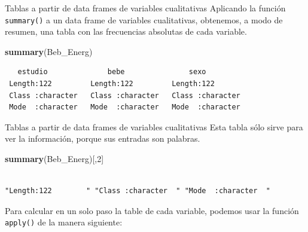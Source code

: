 \documentclass[
  ignorenonframetext,
  aspectratio=169]{beamer}
\newenvironment{Shaded}{\begin{snugshade}}{\end{snugshade}}
\newcommand{\DecValTok}[1]{\textcolor[rgb]{0.00,0.00,0.81}{#1}}
\newcommand{\FunctionTok}[1]{\textcolor[rgb]{0.13,0.29,0.53}{\textbf{#1}}}
\newcommand{\NormalTok}[1]{#1}
\begin{document}
\begin{frame}[fragile]{Tablas a partir de data frames de variables
cualitativas}
\label{tablas-a-partir-de-data-frames-de-variables-cualitativas-3}
Aplicando la función \texttt{summary()} a un data frame de variables
cualitativas, obtenemos, a modo de resumen, una tabla con las
frecuencias absolutas de cada variable.

\begin{Shaded}
\begin{Highlighting}[]
\FunctionTok{summary}\NormalTok{(Beb\_Energ)}
\end{Highlighting}
\end{Shaded}

\begin{verbatim}
   estudio              bebe               sexo          
 Length:122         Length:122         Length:122        
 Class :character   Class :character   Class :character  
 Mode  :character   Mode  :character   Mode  :character  
\end{verbatim}
\end{frame}

\begin{frame}[fragile]{Tablas a partir de data frames de variables
cualitativas}
\label{tablas-a-partir-de-data-frames-de-variables-cualitativas-4}
Esta tabla sólo sirve para ver la información, porque sus entradas son
palabras.

\begin{Shaded}
\begin{Highlighting}[]
\FunctionTok{summary}\NormalTok{(Beb\_Energ)[,}\DecValTok{2}\NormalTok{]}
\end{Highlighting}
\end{Shaded}

\begin{verbatim}
                                                               
"Length:122        " "Class :character  " "Mode  :character  " 
\end{verbatim}

Para calcular en un solo paso la table de cada variable, podemos usar la
función \texttt{apply()} de la manera siguiente:
\end{frame}
\end{document}
